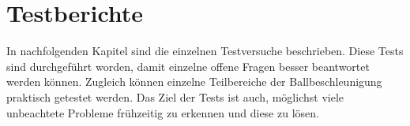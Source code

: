 \section{Testberichte}
In nachfolgenden Kapitel sind die einzelnen Testversuche beschrieben. 
Diese Tests sind durchgeführt worden, damit einzelne offene Fragen 
besser beantwortet werden können. Zugleich können einzelne Teilbereiche 
der Ballbeschleunigung praktisch getestet werden. Das Ziel der Tests ist 
auch, möglichst viele unbeachtete Probleme frühzeitig zu erkennen und 
diese zu lösen. 